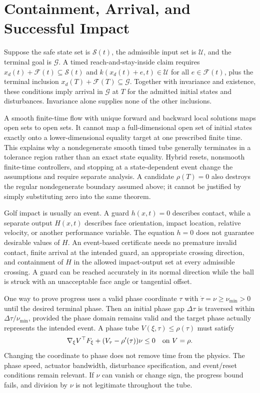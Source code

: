 \documentclass[12pt, openany]{book}
\theoremstyle{plain}
\begin{document}
\section{Containment, Arrival, and Successful Impact}

Suppose the safe state set is $\mathcal S(t)$, the admissible input set is $\mathcal U$, and the terminal goal is $\mathcal G$. A timed reach-and-stay-inside claim requires $x_d(t)+\mathcal F(t)\subseteq\mathcal S(t)$ and $k(x_d(t)+e,t)\in\mathcal U$ for all $e\in\mathcal F(t)$, plus the terminal inclusion $x_d(T)+\mathcal F(T)\subseteq\mathcal G$. Together with invariance and existence, these conditions imply arrival in $\mathcal G$ at $T$ for the admitted initial states and disturbances. Invariance alone supplies none of the other inclusions.

A smooth finite-time flow with unique forward and backward local solutions maps open sets to open sets. It cannot map a full-dimensional open set of initial states exactly onto a lower-dimensional equality target at one prescribed finite time. This explains why a nondegenerate smooth timed tube generally terminates in a tolerance region rather than an exact state equality. Hybrid resets, nonsmooth finite-time controllers, and stopping at a state-dependent event change the assumptions and require separate analysis. A candidate $\rho(T)=0$ also destroys the regular nondegenerate boundary assumed above; it cannot be justified by simply substituting zero into the same theorem.

Golf impact is usually an event. A guard $h(x,t)=0$ describes contact, while a separate output $H(x,t)$ describes face orientation, impact location, relative velocity, or another performance variable. The equation $h=0$ does not guarantee desirable values of $H$. An event-based certificate needs no premature invalid contact, finite arrival at the intended guard, an appropriate crossing direction, and containment of $H$ in the allowed impact-output set at every admissible crossing. A guard can be reached accurately in its normal direction while the ball is struck with an unacceptable face angle or tangential offset.

One way to prove progress uses a valid phase coordinate $\tau$ with $\dot\tau=\nu\geq\nu_{\min}>0$ until the desired terminal phase. Then an initial phase gap $\Delta\tau$ is traversed within $\Delta\tau/\nu_{\min}$, provided the phase domain remains valid and the target phase actually represents the intended event. A phase tube $V(\xi,\tau)\leq\rho(\tau)$ must satisfy
\begin{equation}
 \nabla_\xi V^\top F_\xi+(V_\tau-\rho'(\tau))\nu\leq0
 \quad\hbox{on }V=\rho.
 \label{eq:funnel_phase_condition}
\end{equation}
Changing the coordinate to phase does not remove time from the physics. The phase speed, actuator bandwidth, disturbance specification, and event/reset conditions remain relevant. If $\nu$ can vanish or change sign, the progress bound fails, and division by $\nu$ is not legitimate throughout the tube.
\end{document}
